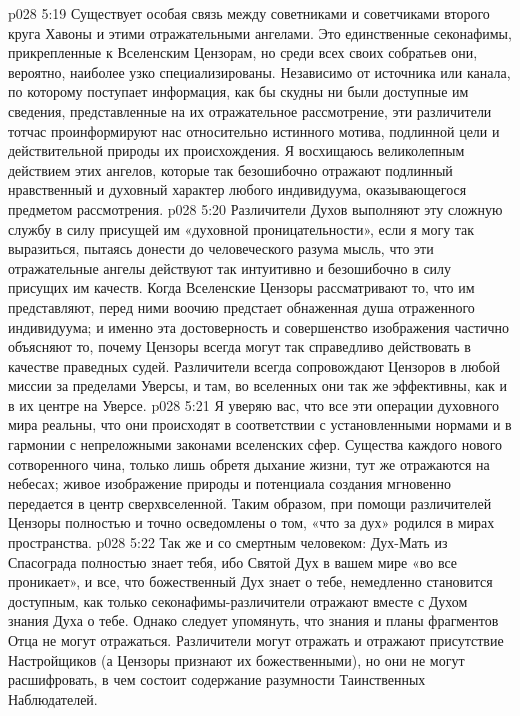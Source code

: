 \vs p028 5:19 \bibnobreakspace {} Существует особая связь между советниками и советчиками второго круга Хавоны и этими отражательными ангелами. Это единственные секонафимы, прикрепленные к Вселенским Цензорам, но среди всех своих собратьев они, вероятно, наиболее узко специализированы. Независимо от источника или канала, по которому поступает информация, как бы скудны ни были доступные им сведения, представленные на их отражательное рассмотрение, эти различители тотчас проинформируют нас относительно истинного мотива, подлинной цели и действительной природы их происхождения. Я восхищаюсь великолепным действием этих ангелов, которые так безошибочно отражают подлинный нравственный и духовный характер любого индивидуума, оказывающегося предметом рассмотрения.
\vs p028 5:20 Различители Духов выполняют эту сложную службу в силу присущей им «духовной проницательности», если я могу так выразиться, пытаясь донести до человеческого разума мысль, что эти отражательные ангелы действуют так интуитивно и безошибочно в силу присущих им качеств. Когда Вселенские Цензоры рассматривают то, что им представляют, перед ними воочию предстает обнаженная душа отраженного индивидуума; и именно эта достоверность и совершенство изображения частично объясняют то, почему Цензоры всегда могут так справедливо действовать в качестве праведных судей. Различители всегда сопровождают Цензоров в любой миссии за пределами Уверсы, и там, во вселенных они так же эффективны, как и в их центре на Уверсе.
\vs p028 5:21 Я уверяю вас, что все эти операции духовного мира реальны, что они происходят в соответствии с установленными нормами и в гармонии с непреложными законами вселенских сфер. Существа каждого нового сотворенного чина, только лишь обретя дыхание жизни, тут же отражаются на небесах; живое изображение природы и потенциала создания мгновенно передается в центр сверхвселенной. Таким образом, при помощи различителей Цензоры полностью и точно осведомлены о том, «что за дух» родился в мирах пространства.
\vs p028 5:22 Так же и со смертным человеком: Дух\hyp{}Мать из Спасограда полностью знает тебя, ибо Святой Дух в вашем мире «во все проникает», и все, что божественный Дух знает о тебе, немедленно становится доступным, как только секонафимы\hyp{}различители отражают вместе с Духом знания Духа о тебе. Однако следует упомянуть, что знания и планы фрагментов Отца не могут отражаться. Различители могут отражать и отражают присутствие Настройщиков (а Цензоры признают их божественными), но они не могут расшифровать, в чем состоит содержание разумности Таинственных Наблюдателей.
